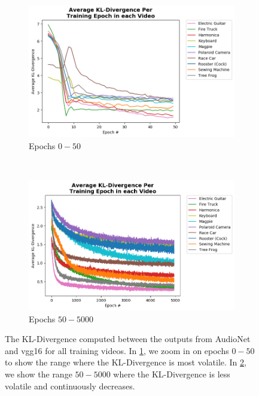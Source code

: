 \documentclass[12pt,twoside]{article}
\theoremstyle{plain}
\theoremstyle{definition}
\theoremstyle{remark}
\begin{document}
\begin{figure}[h!]
    \centering
    \begin{subfigure}[t]{0.5\textwidth}
        \centering
        \includegraphics[width=\textwidth]{final_saved_model.pth.stats.json-kldivs-0-50-plot.png}
        {\caption{\footnotesize Epochs $0-50$}
          \label{fig:kldivs-0-50-plot}}
    \end{subfigure}%
    ~
    \begin{subfigure}[t]{0.5\textwidth}
        \centering
        \includegraphics[width=\textwidth]{final_saved_model.pth.stats.json-kldivs-50-5000-plot.png}
        {\caption{\footnotesize Epochs $50-5000$}
          \label{fig:kldivs-50-5000-plot}}
    \end{subfigure}
    {\caption{\footnotesize The KL-Divergence computed between the outputs from AudioNet and vgg16 for all training videos.
              In \ref{fig:kldivs-0-50-plot}, we zoom in on epochs $0-50$ to show the range where the KL-Divergence is most volatile.
              In \ref{fig:kldivs-50-5000-plot}, we show the range $50-5000$ where the KL-Divergence is less volatile and continuously decreases.}
      \label{fig:kldivs-plot}}
\end{figure}
\end{document}
